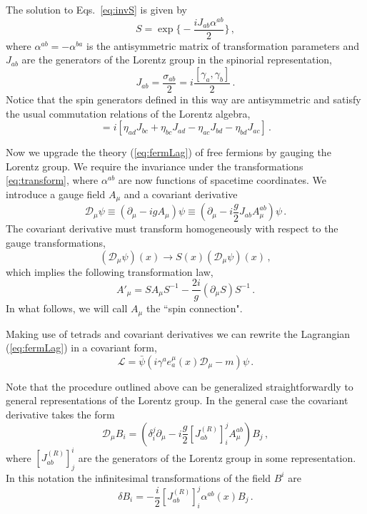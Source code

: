 \documentclass[11pt,a4paper]{article}
\newcommand{\be}{\begin{equation}}
\newcommand{\ee}{\end{equation}}
\newcommand\m{\mu}
\newcommand\D{\Delta}
\def\d{\partial}
\renewcommand{\D}{\mathcal{D}}
\begin{document}
The solution to Eqs.~\eqref{eq:invS} is given by
\be
\label{eq:transform}
S=\exp\Big\{-\frac{iJ_{ab}\alpha^{ab}}{2}\Big\} \,,
\ee
where $\alpha^{ab}=-\alpha^{ba}$ is the antisymmetric matrix of transformation parameters
and $J_{ab}$ are the generators of the Lorentz group in the spinorial representation,
\be
J_{ab}= \frac{\sigma_{ab}}{2}=i\frac{[\gamma_a,\gamma_b]}{2}\,.
\ee
Notice that the spin generators defined in this way are antisymmetric and satisfy the usual commutation relations of the Lorentz algebra,
\be
[J_{ab},J_{cd}]=i\left[\eta_{ad}J_{bc}+\eta_{bc}J_{ad}
-\eta_{ac}J_{bd}-\eta_{bd}J_{ac}\right]\,.
\ee

Now we upgrade the theory (\ref{eq:fermLag}) of free fermions by gauging the Lorentz group. We require the invariance under the transformations \eqref{eq:transform}, where $\alpha^{ab}$ are now functions of spacetime coordinates.
We introduce a gauge field $A_\mu$ and a covariant derivative
\be
\label{eq:covarphi}
\D_\mu \psi\equiv(\d_\mu-ig A_\m)\psi\equiv (\d_\mu-i\frac{g}{2} J_{ab}A^{ab}_\m)\psi\,.
\ee
The covariant derivative must transform homogeneously with respect to the gauge transformations,
\be
(\D_\m \psi) (x)\to S(x) (\D_\m \psi) (x)\,,
\ee
which implies the following transformation law,
\be
A'_\m=S A_\m S^{-1}-\frac{2i}{g}(\d_\mu S)S^{-1}\,.
\ee
In what follows, we will call $A_\mu$ the ``spin connection".


Making use of tetrads and covariant derivatives we can rewrite the Lagrangian (\ref{eq:fermLag}) in a covariant form,
\be
\label{eq:lagr}
\mathcal{L}=\bar \psi (i\gamma^a e^{\m}_a(x)\D_\mu -m)\psi \,.
\ee

Note that the procedure outlined above can be generalized straightforwardly to general representations of the Lorentz group. In the general case the covariant derivative takes the form
\be
\D_\mu B_{i}=(\delta^j_i \d_\mu -i\frac{g}{2} [J^{(R)}_{ab}]^j_i A^{ab}_\m)B_j\,,
\ee
where $[J^{(R)}_{ab}]^i_j$ are the generators of the Lorentz group in some representation. In this notation
the infinitesimal transformations of the field $B^i$ are
\be
\delta B_i=-\frac{i}{2}[J^{(R)}_{ab}]^j_i\alpha^{ab}(x)B_j \,.
\ee
\end{document}
